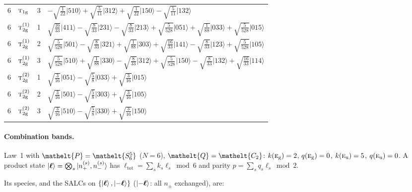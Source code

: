 \documentclass[11pt]{article}
\newcommand{\eltfont}[1]{{\let\sigma\eltsigma\mathelt{#1}}}
\newcommand{\irr}[1]{\text{\normalfont\scshape #1}}
\newcommand{\elt}[1]{\eltfont{#1}}
\newcommand{\ptag}[1]{\mathrm{#1}}
\newcommand{\occ}[1]{\lvert #1\rangle}
\newcommand{\pel}{\elt{P}}             %
\newcommand{\qel}{\elt{Q}}             %
\begin{document}
\begin{longtable}{c l c p{}}
6 & $\irr{t}_{1\ptag{g}}$ & 3 & $-\sqrt{\tfrac{1}{22}}\occ{510}+\sqrt{\tfrac{5}{11}}\occ{312}+\sqrt{\tfrac{1}{22}}\occ{150}-\sqrt{\tfrac{5}{11}}\occ{132}$\\
6 & $\irr{t}_{2\ptag{g}}^{(1)}$ & 1 & $\sqrt{\tfrac{16}{33}}\occ{411}-\sqrt{\tfrac{8}{33}}\occ{231}-\sqrt{\tfrac{8}{33}}\occ{213}+\sqrt{\tfrac{5}{528}}\occ{051}+\sqrt{\tfrac{1}{88}}\occ{033}+\sqrt{\tfrac{5}{528}}\occ{015}$\\
6 & $\irr{t}_{2\ptag{g}}^{(1)}$ & 2 & $\sqrt{\tfrac{5}{528}}\occ{501}-\sqrt{\tfrac{8}{33}}\occ{321}+\sqrt{\tfrac{1}{88}}\occ{303}+\sqrt{\tfrac{16}{33}}\occ{141}-\sqrt{\tfrac{8}{33}}\occ{123}+\sqrt{\tfrac{5}{528}}\occ{105}$\\
6 & $\irr{t}_{2\ptag{g}}^{(1)}$ & 3 & $\sqrt{\tfrac{5}{528}}\occ{510}+\sqrt{\tfrac{1}{88}}\occ{330}-\sqrt{\tfrac{8}{33}}\occ{312}+\sqrt{\tfrac{5}{528}}\occ{150}-\sqrt{\tfrac{8}{33}}\occ{132}+\sqrt{\tfrac{16}{33}}\occ{114}$\\
6 & $\irr{t}_{2\ptag{g}}^{(2)}$ & 1 & $\sqrt{\tfrac{3}{16}}\occ{051}-\sqrt{\tfrac{5}{8}}\occ{033}+\sqrt{\tfrac{3}{16}}\occ{015}$\\
6 & $\irr{t}_{2\ptag{g}}^{(2)}$ & 2 & $\sqrt{\tfrac{3}{16}}\occ{501}-\sqrt{\tfrac{5}{8}}\occ{303}+\sqrt{\tfrac{3}{16}}\occ{105}$\\
6 & $\irr{t}_{2\ptag{g}}^{(2)}$ & 3 & $\sqrt{\tfrac{3}{16}}\occ{510}-\sqrt{\tfrac{5}{8}}\occ{330}+\sqrt{\tfrac{3}{16}}\occ{150}$\\
\hline
\end{longtable}

\paragraph{Combination bands.}

Law~1 with $\pel=\elt{S_{6}^{5}}$ ($N=6$), $\qel=\elt{C_{2}}$: $k(\irr{e}_{\ptag{g}})=2$, $q(\irr{e}_{\ptag{g}})=0$, $k(\irr{e}_{\ptag{u}})=5$, $q(\irr{e}_{\ptag{u}})=0$. A product state $\ket{\boldsymbol\ell}=\bigotimes_s\ket{n_+^{(s)},n_-^{(s)}}$ has $\ell_{\mathrm{tot}}=\sum_sk_s\ell_s\bmod 6$ and parity $p=\sum_sq_s\ell_s\bmod2$.

Its species, and the SALCs on $\{\ket{\boldsymbol\ell},\ket{-\boldsymbol\ell}\}$ ($\ket{-\boldsymbol\ell}$: all $n_\pm$ exchanged), are:
\end{document}
